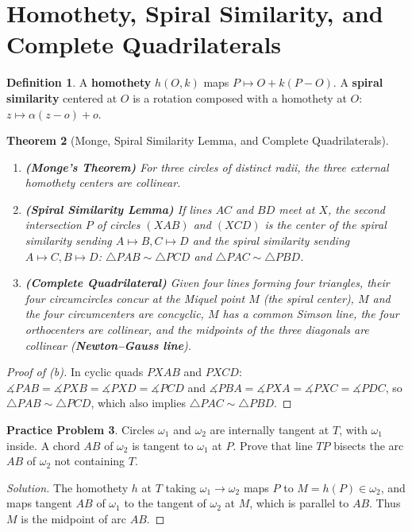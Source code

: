 \documentclass[11pt]{article}
\theoremstyle{plain}
\newtheorem{theorem}{Theorem}[section]
\theoremstyle{definition}
\newtheorem{definition}[theorem]{Definition}
\newtheorem{problem}[theorem]{Practice Problem}
\newenvironment{solution}{\begin{proof}[Solution]}{\end{proof}}
\newcommand{\dang}{\measuredangle}
\begin{document}
\section{Homothety, Spiral Similarity, and Complete Quadrilaterals}

\begin{definition}
A \textbf{homothety} $h(O, k)$ maps $P \mapsto O + k(P - O)$. A \textbf{spiral similarity} centered at $O$ is a rotation composed with a homothety at $O$: $z \mapsto \alpha(z-o)+o$.
\end{definition}

\begin{theorem}[Monge, Spiral Similarity Lemma, and Complete Quadrilaterals]
\leavevmode
\begin{enumerate}[label=(\alph*)]
\item \textbf{(Monge's Theorem)} For three circles of distinct radii, the three external homothety centers are collinear.
\item \textbf{(Spiral Similarity Lemma)} If lines $AC$ and $BD$ meet at $X$, the second intersection $P$ of circles $(XAB)$ and $(XCD)$ is the center of the spiral similarity sending $A \mapsto B, C \mapsto D$ \emph{and} the spiral similarity sending $A \mapsto C, B \mapsto D$: $\triangle PAB \sim \triangle PCD$ and $\triangle PAC \sim \triangle PBD$.
\item \textbf{(Complete Quadrilateral)} Given four lines forming four triangles, their four circumcircles concur at the Miquel point $M$ (the spiral center), $M$ and the four circumcenters are concyclic, $M$ has a common Simson line, the four orthocenters are collinear, and the midpoints of the three diagonals are collinear (\textbf{Newton--Gauss line}).
\end{enumerate}
\end{theorem}
\begin{proof}[Proof of (b)]
In cyclic quads $PXAB$ and $PXCD$: $\dang PAB = \dang PXB = \dang PXD = \dang PCD$ and $\dang PBA = \dang PXA = \dang PXC = \dang PDC$, so $\triangle PAB \sim \triangle PCD$, which also implies $\triangle PAC \sim \triangle PBD$.
\end{proof}

\begin{problem}
Circles $\omega_1$ and $\omega_2$ are internally tangent at $T$, with
$\omega_1$ inside. A chord $AB$ of $\omega_2$ is tangent to $\omega_1$ at $P$.
Prove that line $TP$ bisects the arc $AB$ of $\omega_2$ not containing $T$.
\end{problem}
\begin{solution}
The homothety $h$ at $T$ taking $\omega_1 \to \omega_2$ maps $P$ to $M = h(P) \in \omega_2$, and maps tangent $AB$ of $\omega_1$ to the tangent of $\omega_2$ at $M$, which is parallel to $AB$. Thus $M$ is the midpoint of arc $AB$.
\end{solution}
\end{document}
